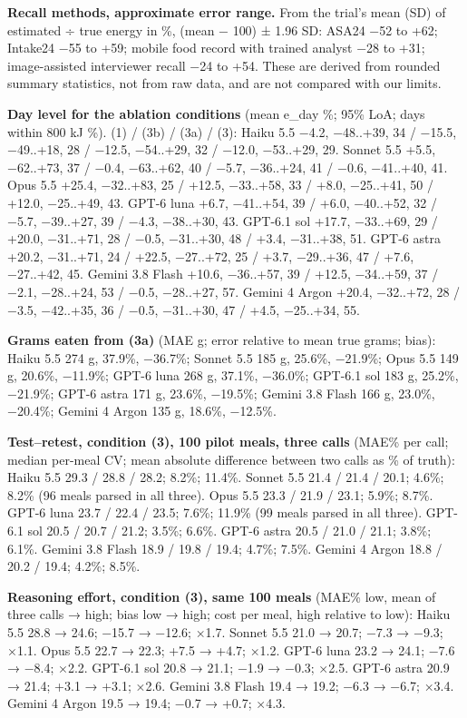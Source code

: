 \documentclass[
  11pt,
  letterpaper]{article}
\begin{document}
\textbf{Recall methods, approximate error range.} From the trial's mean (SD) of estimated ÷ true energy in \%,
(mean − 100) ± 1.96 SD: ASA24 −52 to +62; Intake24 −55 to +59; mobile food record with trained analyst −28 to
+31; image-assisted interviewer recall −24 to +54. These are derived from rounded summary statistics, not from
raw data, and are not compared with our limits.

\textbf{Day level for the ablation conditions} (mean e\_day \%; 95\% LoA; days within 800 kJ \%). (1) / (3b) /
(3a) / (3): Haiku 5.5 −4.2, −48..+39, 34 / −15.5, −49..+18, 28 / −12.5, −54..+29, 32 / −12.0, −53..+29, 29.
Sonnet 5.5 +5.5, −62..+73, 37 / −0.4, −63..+62, 40 / −5.7, −36..+24, 41 / −0.6, −41..+40, 41. Opus 5.5 +25.4,
−32..+83, 25 / +12.5, −33..+58, 33 / +8.0, −25..+41, 50 / +12.0, −25..+49, 43. GPT-6 luna +6.7, −41..+54, 39 /
+6.0, −40..+52, 32 / −5.7, −39..+27, 39 / −4.3, −38..+30, 43. GPT-6.1 sol +17.7, −33..+69, 29 / +20.0,
−31..+71, 28 / −0.5, −31..+30, 48 / +3.4, −31..+38, 51. GPT-6 astra +20.2, −31..+71, 24 / +22.5, −27..+72, 25
/ +3.7, −29..+36, 47 / +7.6, −27..+42, 45. Gemini 3.8 Flash +10.6, −36..+57, 39 / +12.5, −34..+59, 37 / −2.1,
−28..+24, 53 / −0.5, −28..+27, 57. Gemini 4 Argon +20.4, −32..+72, 28 / −3.5, −42..+35, 36 / −0.5, −31..+30,
47 / +4.5, −25..+34, 55.

\textbf{Grams eaten from (3a)} (MAE g; error relative to mean true grams; bias): Haiku 5.5 274 g, 37.9\%,
−36.7\%; Sonnet 5.5 185 g, 25.6\%, −21.9\%; Opus 5.5 149 g, 20.6\%, −11.9\%; GPT-6 luna 268 g, 37.1\%,
−36.0\%; GPT-6.1 sol 183 g, 25.2\%, −21.9\%; GPT-6 astra 171 g, 23.6\%, −19.5\%; Gemini 3.8 Flash 166 g,
23.0\%, −20.4\%; Gemini 4 Argon 135 g, 18.6\%, −12.5\%.

\textbf{Test--retest, condition (3), 100 pilot meals, three calls} (MAE\% per call; median per-meal CV; mean
absolute difference between two calls as \% of truth): Haiku 5.5 29.3 / 28.8 / 28.2; 8.2\%; 11.4\%. Sonnet 5.5
21.4 / 21.4 / 20.1; 4.6\%; 8.2\% (96 meals parsed in all three). Opus 5.5 23.3 / 21.9 / 23.1; 5.9\%; 8.7\%.
GPT-6 luna 23.7 / 22.4 / 23.5; 7.6\%; 11.9\% (99 meals parsed in all three). GPT-6.1 sol 20.5 / 20.7 / 21.2;
3.5\%; 6.6\%. GPT-6 astra 20.5 / 21.0 / 21.1; 3.8\%; 6.1\%. Gemini 3.8 Flash 18.9 / 19.8 / 19.4; 4.7\%; 7.5\%.
Gemini 4 Argon 18.8 / 20.2 / 19.4; 4.2\%; 8.5\%.

\textbf{Reasoning effort, condition (3), same 100 meals} (MAE\% low, mean of three calls → high; bias low →
high; cost per meal, high relative to low): Haiku 5.5 28.8 → 24.6; −15.7 → −12.6; ×1.7. Sonnet 5.5 21.0 →
20.7; −7.3 → −9.3; ×1.1. Opus 5.5 22.7 → 22.3; +7.5 → +4.7; ×1.2. GPT-6 luna 23.2 → 24.1; −7.6 → −8.4; ×2.2.
GPT-6.1 sol 20.8 → 21.1; −1.9 → −0.3; ×2.5. GPT-6 astra 20.9 → 21.4; +3.1 → +3.1; ×2.6. Gemini 3.8 Flash 19.4
→ 19.2; −6.3 → −6.7; ×3.4. Gemini 4 Argon 19.5 → 19.4; −0.7 → +0.7; ×4.3.
\end{document}
